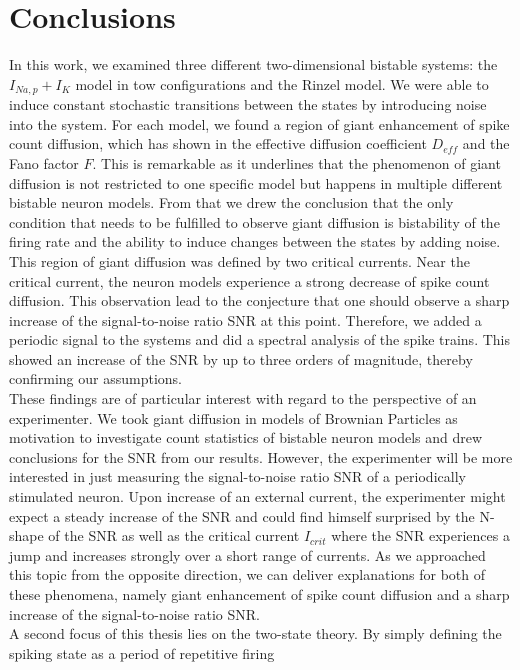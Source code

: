 \documentclass[12pt,a4paper]{article}
\begin{document}
\section{Conclusions}
In this work, we examined three different two-dimensional bistable systems: the $I_{Na,p}+I_K$ model in tow configurations and the Rinzel model. We were able to induce constant stochastic transitions between the states by introducing noise into the system. For each model, we found a region of giant enhancement of spike count diffusion, which has shown in the effective diffusion coefficient $D_{eff}$ and the Fano factor $F$. This is remarkable as it underlines that the phenomenon of giant diffusion is not restricted to one specific model but happens in multiple different bistable neuron models. From that we drew the conclusion that the only condition that needs to be fulfilled to observe giant diffusion is bistability of the firing rate and the ability to induce changes between the states by adding noise. This region of giant diffusion was defined by two critical currents. Near the critical current, the neuron models experience a strong decrease of spike count diffusion. This observation lead to the conjecture that one should observe a sharp increase of the signal-to-noise ratio SNR at this point. Therefore, we added a periodic signal to the systems and did a spectral analysis of the spike trains. This showed an increase of the SNR by up to three orders of magnitude, thereby confirming our assumptions.\\
These findings are of particular interest with regard to the perspective of an experimenter. We took giant diffusion in models of Brownian Particles as motivation to investigate count statistics of bistable neuron models and drew conclusions for the SNR from our results. However, the experimenter will be more interested in just measuring the signal-to-noise ratio SNR of a periodically stimulated neuron. Upon increase of an external current, the experimenter might expect a steady increase of the SNR and could find himself surprised by the N-shape of the SNR as well as the critical current $I_{crit}$ where the SNR experiences a jump and increases strongly over a short range of currents. As we approached this topic from the opposite direction, we can deliver explanations for both of these phenomena, namely giant enhancement of spike count diffusion and a sharp increase of the signal-to-noise ratio SNR.
\\
A second focus of this thesis lies on the two-state theory. By simply defining the spiking state as a period of repetitive firing
\end{document}
